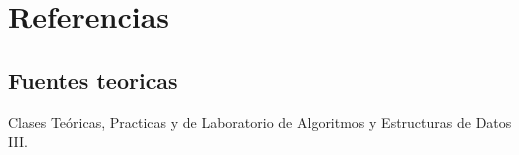 \section{Referencias}

\subsection{Fuentes teoricas}
\indent Clases Teóricas, Practicas y de Laboratorio de Algoritmos y Estructuras de Datos III.\\